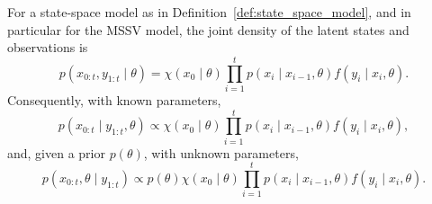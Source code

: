 \begin{proposition}
    \label{prop:joint_density}
    For a state-space model as in Definition~\ref{def:state_space_model}, and in particular for the MSSV model, the joint density of the latent states and observations is
    \begin{equation}
        \label{eq:joint_density}
        p(x_{0:t}, y_{1:t} \mid \theta) = \chi(x_0 \mid \theta) \prod_{i=1}^{t} p(x_i \mid x_{i-1}, \theta) f(y_i \mid x_i, \theta).
    \end{equation}
    Consequently, with known parameters,
    \begin{equation}
        \label{eq:joint_posterior_known_parameters}
        p(x_{0:t} \mid y_{1:t}, \theta) \propto \chi(x_0 \mid \theta) \prod_{i=1}^{t} p(x_i \mid x_{i-1}, \theta) f(y_i \mid x_i, \theta),
    \end{equation}
    and, given a prior $p(\theta)$, with unknown parameters,
    \begin{equation}
        \label{eq:joint_posterior_unknown_parameters}
        p(x_{0:t}, \theta \mid y_{1:t}) \propto p(\theta) \chi(x_0 \mid \theta) \prod_{i=1}^{t} p(x_i \mid x_{i-1}, \theta) f(y_i \mid x_i, \theta).
    \end{equation}
\end{proposition}
